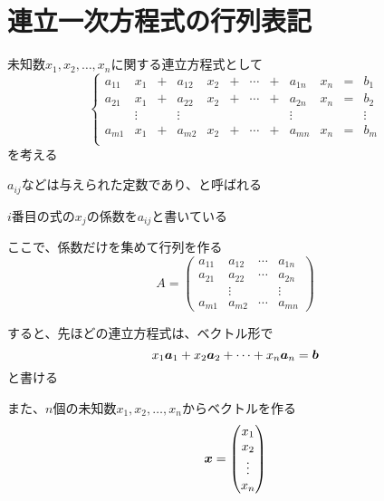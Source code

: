 \documentclass[../../../topic_linear-equation]{subfiles}
\begin{document}
\sectionline
\section{連立一次方程式の行列表記}

未知数$x_1, x_2, \dots, x_n$に関する連立方程式として
\begin{equation*}
  \left\{
  \begin{alignedat}{12}
    a_{11} & x_1    & {}+{} & a_{12} & x_2 & {}+{} & \cdots & {}+{} & a_{1n} & x_n & {}={} & b_1    \\
    a_{21} & x_1    & {}+{} & a_{22} & x_2 & {}+{} & \cdots & {}+{} & a_{2n} & x_n & {}={} & b_2    \\
           & \vdots &       & \vdots &     &       &        &       & \vdots &     &       & \vdots \\
    a_{m1} & x_1    & {}+{} & a_{m2} & x_2 & {}+{} & \cdots & {}+{} & a_{mn} & x_n & {}={} & b_m    \\
  \end{alignedat}
  \right.
\end{equation*}
を考える

$a_{ij}$などは与えられた定数であり、と呼ばれる

$i$番目の式の$x_j$の係数を$a_{ij}$と書いている

\br

ここで、係数だけを集めて行列を作る
\begin{equation*}
  A = \begin{pmatrix}
    a_{11} & a_{12} & \cdots & a_{1n} \\
    a_{21} & a_{22} & \cdots & a_{2n} \\
           & \vdots &        & \vdots \\
    a_{m1} & a_{m2} & \cdots & a_{mn}
  \end{pmatrix}
\end{equation*}

すると、先ほどの連立方程式は、ベクトル形で
\begin{equation*}
  x_1 \vb*{a}_1 + x_2 \vb*{a}_2 + \cdots + x_n \vb*{a}_n = \vb*{b}
\end{equation*}
と書ける

\br

また、$n$個の未知数$x_1, x_2, \dots, x_n$からベクトルを作る
\begin{equation*}
  \vb*{x} = \begin{pmatrix}
    x_1    \\
    x_2    \\
    \vdots \\
    x_n
  \end{pmatrix}
\end{equation*}
\end{document}
